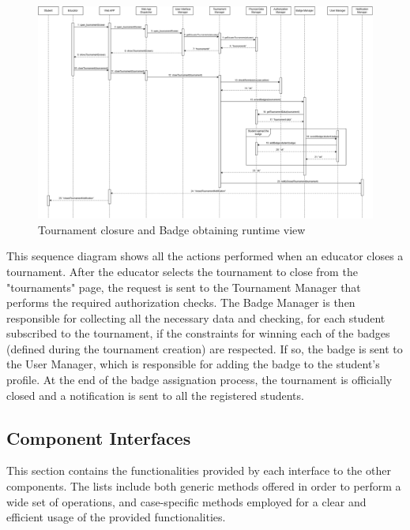\begin{itemize}
    \begin{figure}[H]
        \centering
        \includegraphics[width=1\linewidth]{Images/RV11.png}
        \caption{Tournament closure and Badge obtaining runtime view}
        \label{fig:rv11}
    \end{figure}

    This sequence diagram shows all the actions performed when an educator closes a tournament. After the educator selects the tournament to close from the "tournaments" page, the request is sent to the Tournament Manager that performs the required authorization checks. The Badge Manager is then responsible for collecting all the necessary data and checking, for each student subscribed to the tournament, if the constraints for winning each of the badges (defined during the tournament creation) are respected. If so, the badge is sent to the User Manager, which is responsible for adding the badge to the student's profile. At the end of the badge assignation process, the tournament is officially closed and a notification is sent to all the registered students.

\end{itemize}

\newpage

 \subsection{Component Interfaces}

 This section contains the functionalities provided by each interface to the other components. The lists include both generic methods offered in order to perform a wide set of operations, and case-specific methods employed for a clear and efficient usage of the provided functionalities.

